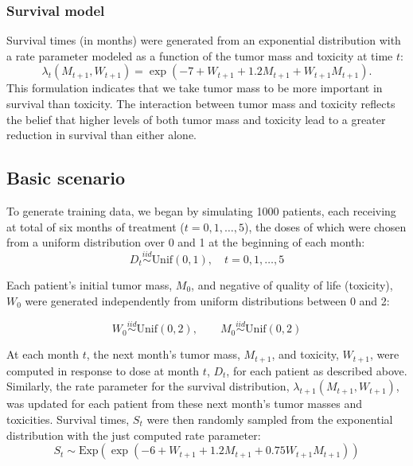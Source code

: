 \documentclass[12pt]{article}
\begin{document}

\subsubsection{Survival model} %
\label{ssub:survival_model}

Survival times (in months) were generated from an exponential distribution with a rate parameter modeled as a function of the tumor mass and toxicity at time $t$:
\begin{equation}
  \lambda_{t}(M_{t+1}, W_{t+1}) = \exp(-7 + W_{t+1} + 1.2 M_{t+1} + W_{t+1} M_{t+1}).
\end{equation}
This formulation indicates that we take tumor mass to be more important in survival than toxicity. The interaction between tumor mass and toxicity reflects the belief that higher levels of both tumor mass and toxicity lead to a greater reduction in survival than either alone.



\subsection{Basic scenario} %
\label{sub:basic_setup}

To generate training data, we began by simulating 1000 patients, each receiving at total of six months of treatment ($t = 0, 1, \ldots, 5$), the doses of which were chosen from a uniform distribution over 0 and 1 at the beginning of each month:
\begin{equation}
  D_{t} \overset{iid}{\sim} \text{Unif}(0, 1), \quad t = 0, 1, \ldots, 5
\end{equation}

Each patient's initial tumor mass, $M_{0}$, and negative of quality of life (toxicity), $W_{0}$ were generated independently from uniform distributions between 0 and 2:

\begin{equation}
  W_{0} \overset{iid}{\sim} \text{Unif}(0, 2), \qquad
  M_{0} \overset{iid}{\sim} \text{Unif}(0, 2)
\end{equation}

At each month $t$, the next month's tumor mass, $M_{t + 1}$, and toxicity, $W_{t + 1}$, were computed in response to dose at month $t$, $D_{t}$, for each patient as described above. Similarly, the rate parameter for the survival distribution, $\lambda_{t+1}(M_{t + 1}, W_{t + 1})$, was updated for each patient from these next month's tumor masses and toxicities. Survival times, $S_{t}$ were then randomly sampled from the exponential distribution with the just computed rate parameter:
\begin{equation}
  S_{t} \sim \text{Exp}(\exp(-6 + W_{t+1} + 1.2 M_{t+1} + 0.75 W_{t+1} M_{t+1}))
\end{equation}
\end{document}
